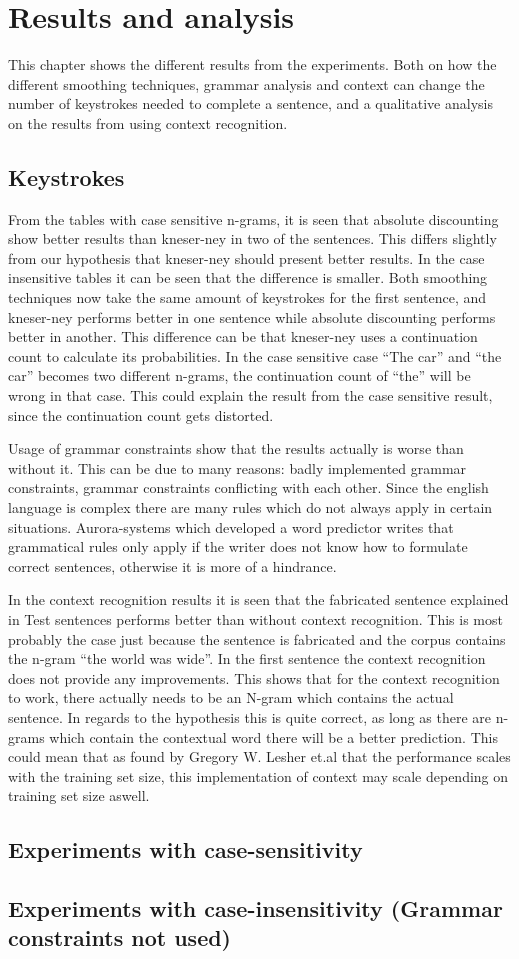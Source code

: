 \section{Results and analysis}
This chapter shows the different results from the experiments. Both on how the different smoothing techniques, grammar analysis and context can change the number of keystrokes needed to complete a sentence, and a qualitative analysis on the results from using context recognition.

\subsection{Keystrokes}
From the tables with case sensitive n-grams, it is seen that absolute discounting show better results than kneser-ney in two of the sentences. This differs slightly from our hypothesis that kneser-ney should present better results. In the case insensitive tables it can be seen that the difference is smaller. Both smoothing techniques now take the same amount of keystrokes for the first sentence, and kneser-ney performs better in one sentence while absolute discounting performs better in another. This difference can be that kneser-ney uses a continuation count to calculate its probabilities. In the case sensitive case “The car” and “the car” becomes two different n-grams, the continuation count of “the” will be wrong in that case. This could explain the result from the case sensitive result, since the continuation count gets distorted. 

Usage of grammar constraints show that the results actually is worse than without it. This can be due to many reasons: badly implemented grammar constraints, grammar constraints conflicting with each other. Since the english language is complex there are many rules which do not always apply in certain situations. Aurora-systems which developed a word predictor writes that grammatical rules only apply if the writer does not know how to formulate correct sentences, otherwise it is more of a hindrance\cite{aurora}.

In the context recognition results it is seen that the fabricated sentence explained in Test sentences performs better than without context recognition. This is most probably the case just because the sentence is fabricated and the corpus contains the n-gram “the world was wide”. In the first sentence the context recognition does not provide any improvements. This shows that for the context recognition to work, there actually needs to be an N-gram which contains the actual sentence. In regards to the hypothesis this is quite correct, as long as there are n-grams which contain the contextual word there will be a better prediction. This could mean that as found by Gregory W. Lesher et.al that the performance scales with the training set size\cite{Lesher99effectsof}, this implementation of context may scale depending on training set size aswell.
\vspace{1em}
\subsection*{Experiments with case-sensitivity}
\subsection*{Experiments with case-insensitivity (Grammar constraints not used)}